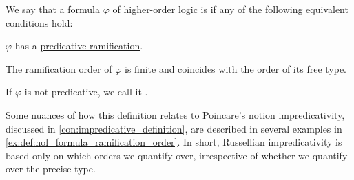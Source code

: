 \begin{definition}\label{def:hol_formula_predicativity}\mimprovised
  We say that a \hyperref[def:hol_term/formula]{formula} \( \varphi \) of \hyperref[def:higher_order_logic]{higher-order logic} is  if any of the following equivalent conditions hold:
  \begin{thmenum}
     \( \varphi \) has a \hyperref[def:ramified_theory_of_types/predicativity]{predicative ramification}.

     The \hyperref[def:hol_formula_ramification_order]{ramification order} of \( \varphi \) is finite and coincides with the order of its \hyperref[def:hol_formula_free_type]{free type}.
  \end{thmenum}

  If \( \varphi \) is not predicative, we call it .
\end{definition}
\begin{comments}
  \item Some nuances of how this definition relates to Poincare's notion impredicativity, discussed in \cref{con:impredicative_definition}, are described in several examples in \cref{ex:def:hol_formula_ramification_order}. In short, Russellian impredicativity is based only on which orders we quantify over, irrespective of whether we quantify over the precise type.
\end{comments}
